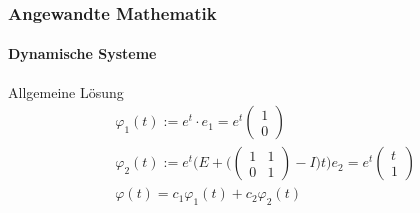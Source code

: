 \documentclass{beamer}
\begin{document}
 \begin{frame}
    \frametitle{Angewandte Mathematik}
\framesubtitle{Dynamische Systeme }

\begin{block}{Allgemeine Lösung}
    \begin{align*}
        & \varphi_1(t) := e^t \cdot e_1 = e^t \begin{pmatrix} 1 \\ 0\end{pmatrix} \\
        & \varphi_2(t) := e^t \biggl (E  +  \bigl (\begin{pmatrix} 1 & 1 \\ 0 & 1\end{pmatrix} - I\bigl)t \biggr )e_2 = e^t \begin{pmatrix} t  \\ 1 \end{pmatrix} \\
        & \varphi(t) = c_1 \varphi_1(t) +  c_2\varphi_2(t)
    \end{align*}
\end{block}
 \end{frame}
\end{document}
